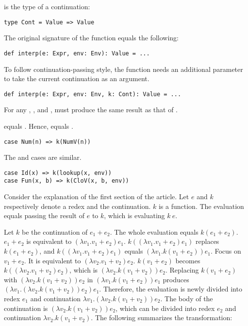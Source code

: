  is the type of a continuation:

\begin{verbatim}
type Cont = Value => Value
\end{verbatim}

The original signature of the  function equals the following:

\begin{verbatim}
def interp(e: Expr, env: Env): Value = ...
\end{verbatim}

To follow continuation-passing style, the function needs an additional parameter
to take the current continuation as an argument.

\begin{verbatim}
def interp(e: Expr, env: Env, k: Cont): Value = ...
\end{verbatim}

For any , , and ,  must produce
the same result as that of .

 equals . Hence,  equals .

\begin{verbatim}
case Num(n) => k(NumV(n))
\end{verbatim}

The  and  cases are similar.

\begin{verbatim}
case Id(x) => k(lookup(x, env))
case Fun(x, b) => k(CloV(x, b, env))
\end{verbatim}

Consider the explanation of the first section of the article. Let $e$ and $k$
respectively denote a redex and the continuation. $k$ is a function. The
evaluation equals passing the result of $e$ to $k$, which is evaluating $k\ e$.

Let $k$ be the continuation of $e_1+e_2$. The whole evaluation equals
$k(e_1+e_2)$. $e_1+e_2$ is equivalent to $(\lambda v_1.v_1+e_2)e_1$. $k((\lambda
v_1.v_1+e_2)e_1)$ replaces $k(e_1+e_2)$, and $k((\lambda v_1.v_1+e_2)e_1)$ equals
$(\lambda v_1.k(v_1+e_2))e_1$. Focus on $v_1+e_2$. It is equivalent to $(\lambda
v_2.v_1+v_2)e_2$. $k(v_1+e_2)$ becomes $k((\lambda v_2.v_1+v_2)e_2)$, which is
$(\lambda v_2.k(v_1+v_2))e_2$. Replacing $k(v_1+e_2)$ with $(\lambda
v_2.k(v_1+v_2))e_2$ in $(\lambda v_1.k(v_1+e_2))e_1$ produces $(\lambda
v_1.(\lambda v_2.k(v_1+v_2))e_2)e_1$. Therefore, the evaluation is newly divided
into redex $e_1$ and continuation $\lambda v_1.(\lambda v_2.k(v_1+v_2))e_2$. The
body of the continuation is $(\lambda v_2.k(v_1+v_2))e_2$, which can be divided
into redex $e_2$ and continuation $\lambda v_2.k(v_1+v_2)$. The following
summarizes the transformation:

